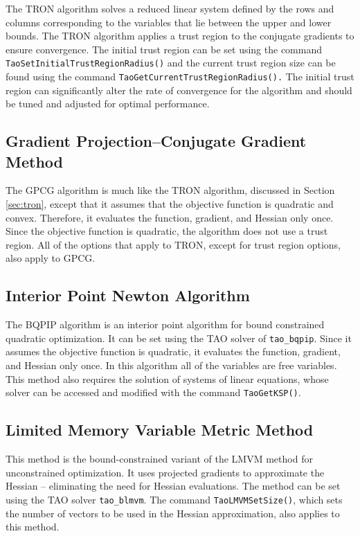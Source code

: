 The TRON algorithm solves a reduced linear system
defined by the rows and columns corresponding to the variables that
lie between the upper and lower bounds.
The TRON algorithm applies a trust region to the 
conjugate gradients to ensure convergence.  The initial trust region
can be set using the command 
{\tt TaoSetInitialTrustRegionRadius()}
and the current trust region size can be found using the command
{\tt TaoGetCurrentTrustRegionRadius().}
The initial trust region can significantly alter the 
rate of convergence for the algorithm and should be
tuned and adjusted for optimal performance.


\subsection{Gradient Projection--Conjugate Gradient Method}
The GPCG \cite{more-toraldo} algorithm is much like the TRON algorithm, discussed in
Section \ref{sec:tron}, except that
it assumes that the objective function is quadratic and convex.
Therefore, it evaluates the function, gradient, and Hessian only
once.
Since the objective function
is quadratic, the algorithm does not use a trust region.  
All of the options that apply to TRON, except for trust region
options,  also apply to GPCG.

\subsection{Interior Point Newton Algorithm}\label{sec:bqpip}
The BQPIP algorithm is an interior point algorithm for bound
constrained quadratic optimization.  It can be set using the
TAO solver of {\tt tao\_bqpip}.
Since it assumes the objective function is quadratic, 
it evaluates the function, gradient, and Hessian only once.
In this algorithm all of the variables are free variables.
This method also requires the solution of systems of linear equations,
whose solver can be accessed and modified 
with the command {\tt TaoGetKSP()}.

\subsection{Limited Memory Variable Metric Method}

This method is the bound-constrained variant of the LMVM method for
unconstrained optimization.  It uses projected gradients to approximate
the Hessian -- eliminating the need for Hessian evaluations.
The method can be set using the TAO solver {\tt tao\_blmvm}.
The command {\tt TaoLMVMSetSize()}, which sets the number
of vectors to be used in the Hessian approximation, 
also applies to this method.

